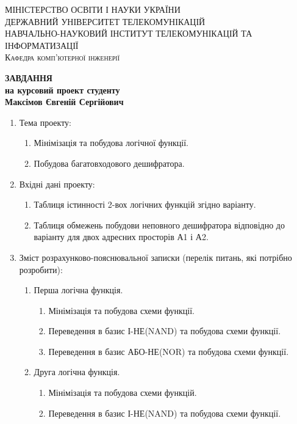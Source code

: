 \begin{center}
\textsc{МІНІСТЕРСТВО ОСВІТИ І НАУКИ УКРАЇНИ \\[2mm]
ДЕРЖАВНИЙ УНІВЕРСИТЕТ ТЕЛЕКОМУНІКАЦІЙ \\[5mm]
НАВЧАЛЬНО-НАУКОВИЙ ІНСТИТУТ ТЕЛЕКОМУНІКАЦІЙ ТА ІНФОРМАТИЗАЦІЇ\\[2mm]
Кафедра комп'ютерної інженерії}

\vfill

\textbf{ЗАВДАННЯ \\[3mm]
на курсовий проект студенту\\[6mm]
Максімов Євгеній Сергійович\\[6mm]
}
\end{center}
\begin{enumerate}
	\item Тема проекту:
	\begin{enumerate}[label={1.\arabic*}]
		\item Мінімізація та побудова логічної функції.
		\item Побудова багатовходового дешифратора.
	\end{enumerate}
	\item Вхідні дані проекту:
	\begin{enumerate}[label={2.\arabic*}]
		\item Таблиця істинності 2-вох логічних функцій згідно варіанту.
		\item Таблиця обмежень побудови неповного дешифратора відповідно до варіанту для двох адресних просторів А1 і А2.
	\end{enumerate}
	\item Зміст розрахунково-пояснювальної записки (перелік питань, які потрібно
розробити):
	\begin{enumerate}[label={3.\arabic*}]
		\item  Перша логічна функція.
		\begin{enumerate}[label={3.1.\arabic*}]
			\item Мінімізація та побудова схеми функції.
			\item Переведення в базис І-НЕ(NAND) та побудова схеми функції.
			\item Переведення в базис АБО-НЕ(NOR) та побудова схеми функції.
		\end{enumerate}
		\item  Друга логічна функція.
		\begin{enumerate}[label={3.2.\arabic*}]
			\item Мінімізація та побудова схеми функцій.
			\item Переведення в базис І-НЕ(NAND) та побудова схеми функції.

\end{enumerate}
\end{enumerate}
\end{enumerate}
